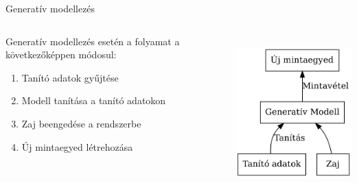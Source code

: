 \documentclass[english, aspectratio=169]{beamer}
\begin{document}
\begin{frame}{Generatív modellezés}
\begin{columns}
\begin{column}{.5\textwidth}
Generatív modellezés esetén a folyamat a következőképpen módosul:
\begin{enumerate}
	\item Tanító adatok gyűjtése
	\item Modell tanítása a tanító adatokon
	\item Zaj beengedése a rendszerbe
	\item Új mintaegyed létrehozása
\end{enumerate}
\end{column}
\begin{column}{.5\textwidth}
\begin{center}
\includegraphics[width=6cm, height=6cm, keepaspectratio]{graphs/generative_3.png}
\end{center}
\end{column}
\end{columns}
\end{frame}
\end{document}
